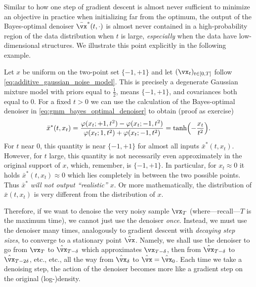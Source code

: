 \documentclass[../../book-main.tex]{subfiles}
\begin{document}
Similar to how one step of gradient descent is almost never sufficient to
minimize an objective in practice when initializing far from the optimum, the
output of the Bayes-optimal denoiser \(\bar{\vx}^{\ast}(t, \cdot)\) is almost never contained in a high-probability region of the data distribution when \(t\) is large, \textit{especially} when the data have low-dimensional structures. We illustrate this point explicitly in the following example.
\begin{example}\label{example:denoising_twopoints}
	Let \(x\) be uniform on the two-point set \(\{-1, +1\}\) and let \((\vx_{t})_{t \in [0, T]}\) follow \eqref{eq:additive_gaussian_noise_model}. This is precisely a degenerate Gaussian mixture model with priors equal to \(\frac{1}{2}\), means \(\{-1, +1\}\), and covariances both equal to \(0\). For a fixed \(t > 0\) we can use the calculation of the Bayes-optimal denoiser in \eqref{eq:gmm_bayes_optimal_denoiser} to obtain (proof as exercise)
	\begin{equation}
		\bar{x}^{\ast}(t, x_{t}) = \frac{\phi(x_{t} ; +1, t^{2}) - \phi(x_{t}
		; -1, t^{2})}{\phi(x_{t} ; 1, t^{2}) + \phi(x_{t} ; -1, t^{2})} = \tanh\rp{-\frac{x_{t}}{t^{2}}}.
	\end{equation}
	For \(t\) near \(0\), this quantity is near \(\{-1, +1\}\) for almost all inputs \(\bar{x}^{\ast}(t, x_{t})\). However, for \(t\) large, this quantity is not necessarily even approximately in the original support of \(x\), which, remember, is \(\{-1, +1\}\). In particular, for \(x_{t} \approx 0\) it holds \(\bar{x}^{\ast}(t, x_{t}) \approx 0\) which lies completely in between the two possible points. Thus \(\bar{x}^{\ast}\) \textit{will not output ``realistic'' \(x\)}. Or more mathematically, the distribution of \(\bar{x}(t, x_{t})\) is very different from the distribution of \(x\).
\end{example}

Therefore, if we want to denoise the very noisy sample \(\vx_{T}\) (where---recall---\(T\) is the maximum time), we cannot just use the denoiser \textit{once}. Instead, we must use the denoiser many times, analogously to gradient descent with \textit{decaying step sizes}, to converge to a stationary point \(\hat{\vx}\). Namely, we shall use the denoiser to go from \(\vx_{T}\) to \(\hat{\vx}_{T - \delta}\) which approximates \(\vx_{T - \delta}\), then from \(\hat{\vx}_{T - \delta}\) to \(\hat{\vx}_{T - 2\delta}\), etc., etc., all the way from \(\hat{\vx}_{\delta}\) to \(\hat{\vx} = \hat{\vx}_{0}\). Each time we take a denoising step, the action of the denoiser becomes more like a gradient step on the original (log-)density. 
\end{document}
